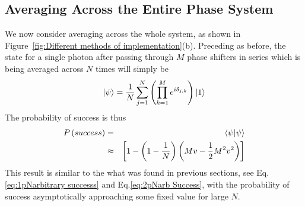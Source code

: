 \documentclass[aps,pra,twocolumn,superscriptaddress,numerical,floatfix]{revtex4-1}
\begin{document}
\subsection{Averaging Across the Entire Phase System\label{Averaging Across the Entire Phase System}}

We now consider averaging across the whole system, as shown in Figure~\ref{fig:Different methods of implementation}(b). Preceding as before, the state for a single photon after passing through $M$ phase shifters in series which is being averaged across $N$ times will simply be
\begin{equation}
	\ket{\psi}=\frac{1}{N}\sum_{j=1}^{N}\left(\prod_{k=1}^{M}e^{i\delta_{j,k}}\right)\ket{1} \label{eq:AvEndPhaseState}
\end{equation}
The probability of success is thus
\begin{eqnarray}
	P\left(success\right) & = & \braket{\psi|\psi} \nonumber \\
& \approx & \left[1-\left(1-\frac{1}{N}\right)\left(Mv-\frac{1}{2}M^{2}v^{2}\right)\right]\label{eq:AveEndProbSuccess}
\end{eqnarray}
This result is similar to the what was found in previous sections, see Eq.\ref{eq:1pNarbitrary successs} and Eq.\ref{eq:2pNarb Success}, with the probability of success asymptotically approaching some fixed value for large $N$.
\end{document}
